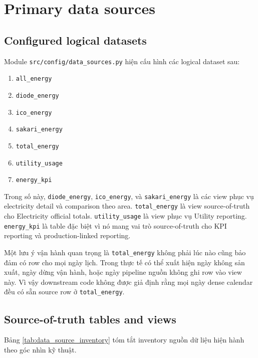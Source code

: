 \section{Primary data sources}

\subsection{Configured logical datasets}

Module \texttt{src/config/data\_sources.py} hiện cấu hình các logical dataset sau:

\begin{enumerate}[label=-]
\item \texttt{all\_energy}
\item \texttt{diode\_energy}
\item \texttt{ico\_energy}
\item \texttt{sakari\_energy}
\item \texttt{total\_energy}
\item \texttt{utility\_usage}
\item \texttt{energy\_kpi}
\end{enumerate}

Trong số này, \texttt{diode\_energy}, \texttt{ico\_energy}, và \texttt{sakari\_energy} là các view phục vụ electricity detail và comparison theo area. \texttt{total\_energy} là view source-of-truth cho Electricity official totals. \texttt{utility\_usage} là view phục vụ Utility reporting. \texttt{energy\_kpi} là table đặc biệt vì nó mang vai trò source-of-truth cho KPI reporting và production-linked reporting.

Một lưu ý vận hành quan trọng là \texttt{total\_energy} không phải lúc nào cũng bảo đảm có row cho mọi ngày lịch. Trong thực tế có thể xuất hiện ngày không sản xuất, ngày dừng vận hành, hoặc ngày pipeline nguồn không ghi row vào view này. Vì vậy downstream code không được giả định rằng mọi ngày dense calendar đều có sẵn source row ở \texttt{total\_energy}.

\subsection{Source-of-truth tables and views}

Bảng \ref{tab:data_source_inventory} tóm tắt inventory nguồn dữ liệu hiện hành theo góc nhìn kỹ thuật.

